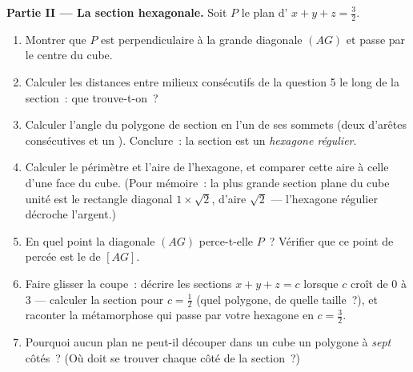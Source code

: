 \begin{problem}
\medskip
\noindent\textbf{Partie II --- La section hexagonale.}
Soit $P$ le plan d' $x + y + z = \frac32$.
\begin{enumerate}[resume]
  \item Montrer que $P$ est perpendiculaire à la grande diagonale
        $(AG)$ et passe par le centre du cube.
  \item Calculer les distances entre milieux consécutifs de la
        question 5 le long de la section~: que trouve-t-on~?
  \item Calculer l'angle du polygone de section en l'un de ses
        sommets (deux  d'arêtes consécutives et un ). Conclure~: la section est un \emph{hexagone
        régulier}.
  \item Calculer le périmètre et l'aire de l'hexagone, et comparer
        cette aire à celle d'une face du cube. (Pour mémoire~: la
        plus grande section plane du cube unité est le rectangle
        diagonal $1 \times \sqrt2$, d'aire $\sqrt2$ --- l'hexagone
        régulier décroche l'argent.)
  \item En quel point la diagonale $(AG)$ perce-t-elle $P$~?
        Vérifier que ce point de percée est le  de $[AG]$.
  \item Faire glisser la coupe~: décrire les sections
        $x + y + z = c$ lorsque $c$ croît de $0$ à $3$ --- calculer
        la section pour $c = \frac12$ (quel polygone, de quelle
        taille~?), et raconter la métamorphose qui passe par votre
        hexagone en $c = \frac32$.
  \item Pourquoi aucun plan ne peut-il découper dans un cube un
        polygone à \emph{sept} côtés~? (Où doit se trouver chaque
        côté de la section~?)
\end{enumerate}


\end{problem}

